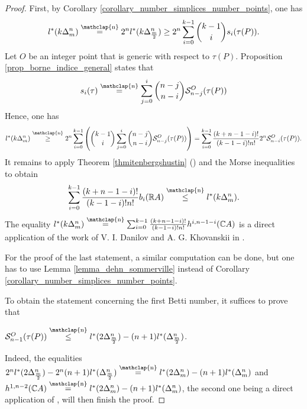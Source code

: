 \documentclass[12pt]{article}
\newcommand\customeq{\stackrel{\mathclap{\normalfont\scriptsize\mbox{n}}}{=}}
\newcommand\customleq{\stackrel{\mathclap{\normalfont\scriptsize\mbox{n}}}{\leq}}
\newcommand\customgeq{\stackrel{\mathclap{\normalfont\scriptsize\mbox{n}}}{\geq}}
\newcommand{\R}{\mathbb{R}}
\newcommand{\C}{\mathbb{C}}
\theoremstyle{definition}
\begin{document}
\begin{proof}
    First, by Corollary \ref{corollary_number_simplices_number_points}, one has
    \begin{equation*}
        l^*(k\Delta_m^n) \customeq 2^nl^*(k\Delta_{\frac{m}{2}}^n) \geq 2^n\sum_{i=0}^{k-1} {k-1 \choose i} s_i(\tau(P)).
    \end{equation*}
    Let $O$ be an integer point that is generic with respect to $\tau(P)$.
    Proposition \ref{prop_borne_indice_general} states that
    \begin{equation*}
        s_i(\tau) \customeq \sum_{j=0}^i { n-j \choose n-i } \mathcal{S}_{n-j}^O(\tau(P))
    \end{equation*}
    Hence, one has 
    \begin{equation*}
        l^*(k\Delta_m^n) \customgeq 2^n\sum_{i=0}^{k-1} \left( {k-1 \choose i} \sum_{j=0}^i { n-j \choose n-i } \mathcal{S}_{n-j}^O(\tau(P)) \right) = \sum_{i=0}^{k-1} \frac{(k+n-1-i)!}{(k-1-i)!n!} 2^n\mathcal{S}_{n-i}^O(\tau(P)).
    \end{equation*}
    It remains to apply Theorem \ref{thmitenbergshustin} (\cite{itenbergshustincritpts}) and the Morse inequalities to obtain
    \begin{equation*}
        \sum_{i=0}^{k-1} \frac{(k+n-1-i)!}{(k-1-i)!n!} b_i(\R A) \customleq l^*(k\Delta_m^n).
    \end{equation*}
    The equality $l^*(k\Delta_m^n) \customeq \sum_{i=0}^{k-1} \frac{(k+n-1-i)!}{(k-1-i)!n!} h^{i,n-1-i}(\C A)$ is a direct application of the work of V. I. Danilov and A. G. Khovanskii in \cite{danilkhovan}.
    
    For the proof of the last statement, a similar computation can be done, but one has to use Lemma \ref{lemma_dehn_sommerville} instead of Corollary \ref{corollary_number_simplices_number_points}.

    To obtain the statement concerning the first Betti number, it suffices to prove that \begin{center}$\mathcal{S}_{n-1}^O(\tau(P)) \customleq l^*(2\Delta_{\frac{m}{2}}^n) - (n+1) l^*(\Delta_{\frac{m}{2}}^n)$.\end{center}
    Indeed, the equalities $2^nl^*(2\Delta_{\frac{m}{2}}^n) - 2^n(n+1)l^*(\Delta_{\frac{m}{2}}^n) \customeq l^*(2\Delta_{m}^n) - (n+1) l^*(\Delta_{m}^n)$ and $h^{1,n-2}(\C A) \customeq l^*(2\Delta_{m}^n) - (n+1) l^*(\Delta_{m}^n)$, the second one being a direct application of \cite{danilkhovan}, will then finish the proof.
    

\end{proof}
\end{document}

